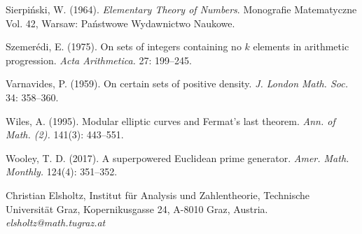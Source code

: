 \documentclass{article}
\theoremstyle{theorem}
\theoremstyle{definition}
\begin{document}
\begin{thebibliography}{99}
Sierpi\'{n}ski, W. (1964).
\textit{Elementary Theory of Numbers}.
Monografie Matematyczne Vol.  42, Warsaw: 
Pa\'{n}stwowe Wydawnictwo Naukowe. 

Szemer\'{e}di, E. (1975).
On sets of integers containing no $k$ elements in arithmetic progression.
\textit{Acta Arithmetica.} 27: 199--245.

Varnavides, P. (1959).
On certain sets of positive density.
\textit{J. London Math. Soc.} 34: 358--360. 

Wiles, A. (1995). Modular elliptic curves and Fermat's last theorem.
\textit{Ann. of Math. (2).} 141(3): 443--551. 

Wooley, T. D. (2017).
A superpowered Euclidean prime generator.
\textit{Amer. Math. Monthly.} 124(4): 351--352. 
\end{thebibliography}


  
\begin{affil}
Christian Elsholtz, Institut f\"ur Analysis und Zahlentheorie,
Technische Universit\"at Graz,
Kopernikusgasse 24,
A-8010 Graz, Austria.\\
{\it elsholtz@math.tugraz.at}
\end{affil}
\end{document}
